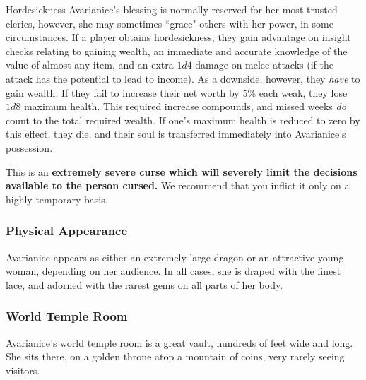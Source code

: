 \begin{adventureidea}{Hordesickness}
Avarianice's blessing is normally reserved for her most trusted clerics, however, she may sometimes ``grace" others with her power, in some circumstances.
If a player obtains hordesickness, they gain advantage on insight checks relating to gaining wealth, an immediate and accurate knowledge of the value of almost any item, and an extra $ 1d4 $ damage on melee attacks (if the attack has the potential to lead to income).
As a downside, however, they \textit{have} to gain wealth.
If they fail to increase their net worth by 5\% each weak, they lose $1d8$ maximum health.
This required increase compounds, and missed weeks \textit{do} count to the total required wealth.
If one's maximum health is reduced to zero by this effect, they die, and their soul is transferred immediately into Avarianice's possession.

This is an \textbf{extremely severe curse which will severely limit the decisions available to the person cursed.}
We recommend that you inflict it only on a highly temporary basis.
\end{adventureidea}

\subsubsection*{Physical Appearance}
Avarianice appears as either an extremely large dragon or an attractive young woman, depending on her audience.
In all cases, she is draped with the finest lace, and adorned with the rarest gems on all parts of her body.

\subsubsection*{World Temple Room}
Avarianice's world temple room is a great vault, hundreds of feet wide and long.
She sits there, on a golden throne atop a mountain of coins, very rarely seeing visitors.
